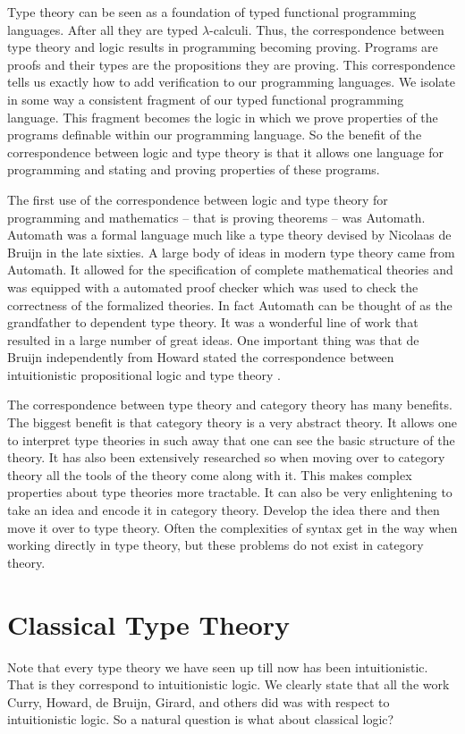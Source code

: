 \documentclass{article}
\begin{document}
Type theory can be seen as a foundation of typed functional
programming languages.  After all they are typed $\lambda$-calculi.
Thus, the correspondence between type theory and logic results in
programming becoming proving.  Programs are proofs and their types are
the propositions they are proving.  This correspondence tells us
exactly how to add verification to our programming languages.  We
isolate in some way a consistent fragment of our typed functional
programming language.  This fragment becomes the logic in which we
prove properties of the programs definable within our programming
language.  So the benefit of the correspondence between logic and type
theory is that it allows one language for programming and stating and
proving properties of these programs.  

The first use of the correspondence between logic and type theory for
programming and mathematics -- that is proving theorems -- was
Automath.  Automath was a formal language much like a type theory
devised by Nicolaas de Bruijn in the late sixties.  A large body of
ideas in modern type theory came from Automath.  It allowed for the
specification of complete mathematical theories and was equipped with
a automated proof checker which was used to check the correctness of
the formalized theories.  In fact Automath can be thought of as the
grandfather to dependent type theory.  It was a wonderful line of work
that resulted in a large number of great ideas.  One important thing
was that de Bruijn independently from Howard stated the correspondence
between intuitionistic propositional logic and type theory
\cite{Sorensen:2006}.

The correspondence between type theory and category theory has many
benefits.  The biggest benefit is that category theory is a very
abstract theory.  It allows one to interpret type theories in such
away that one can see the basic structure of the theory.  It has also
been extensively researched so when moving over to category theory all
the tools of the theory come along with it.  This makes complex
properties about type theories more tractable.  It can also be very
enlightening to take an idea and encode it in category theory.
Develop the idea there and then move it over to type theory.  Often
the complexities of syntax get in the way when working directly in
type theory, but these problems do not exist in category theory.

\section{Classical Type Theory}
\label{sec:classical_type_theory}
Note that every type theory we have seen up till now has been
intuitionistic.  That is they correspond to intuitionistic logic.  We
clearly state that all the work Curry, Howard, de Bruijn, Girard, and
others did was with respect to intuitionistic logic.  So a natural
question is what about classical logic?
\end{document}
